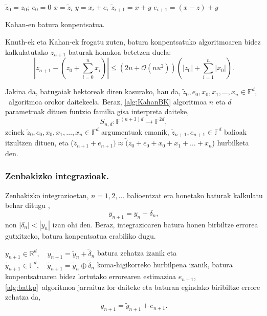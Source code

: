 \begin{algorithm}[H]
 \BlankLine
  $\tilde z_0= z_0; \ e_0=0$\;
  {
   \BlankLine
    $x=\tilde z_i$\;
    $y= x_i+e_i$\;
    $\tilde z_{i+1}=x+y$\;
    $e_{i+1}=(x-z)+y$\;
   \BlankLine
  }
 \caption{Kahan-en batura konpentsatua.}
   \label{alg:KahanBK}
\end{algorithm}

Knuth-ek eta Kahan-ek \cite{Muller2009} frogatu zuten,  batura konpentsatuko algoritmoaren bidez kalkulatutako $z_{n+1}$ baturak honakoa betetzen duela:
\begin{equation*}
\left | z_{n+1} - (z_0+\sum_{i=0}^{n} x_i) \right | \leq (2u+ \mathcal{O}(nu^2)) \left(|z_0|+\sum_{i=1}^{n} |x_0|\right).
\end{equation*}

Jakina da, batugaiak bektoreak diren kasurako, hau da, $\tilde z_0, e_0, x_0, x_1, \dots, x_n \in \mathbb{F}^d$, ~algoritmoa orokor daitekeela. Beraz, \ref{alg:KahanBK} algoritmoa $n$ eta $d$ parametroak dituen funtzio familia gisa interpreta daiteke,
\begin{equation}
\label{eq:batsd}
S_{n,d} : \mathbb{F}^{(n+3)d} \rightarrow \mathbb{F}^{2d},
\end{equation}
zeinek $\tilde z_0, e_0, x_0, x_1, \dots, x_n \in \mathbb{F}^d$ argumentuak emanik, $\tilde z_{n+1}, e_{n+1} \in \mathbb{F}^d$ balioak itzultzen dituen, eta ($\tilde z_{n+1}+e_{n+1}) \approx \tilde (z_0+e_0+x_0+x_1+ \dots+x_n$) hurbilketa den.

\subsubsection*{Zenbakizko integrazioak.}
 
Zenbakizko integrazioetan, $n=1,2,\dots$ balioentzat era honetako baturak kalkulatu behar ditugu \cite{Hairer2006},
\begin{equation*}
y_{n+1}=y_n+\delta_n,
\end{equation*}  
non $|\delta_n|<|y_n|$ izan ohi den. Beraz, integrazioaren batura honen birbiltze errorea gutxitzeko, batura konpentsatua erabiliko dugu.  

$y_{n+1} \in \mathbb{R}^{d},\quad y_{n+1}=\tilde y_{n}+\tilde \delta_n$ batura zehatza izanik eta $\tilde y_{n+1} \in \mathbb{F}^{d}, \quad \tilde y_{n+1}=\tilde y_{n} \oplus \tilde \delta_n$ koma-higikorreko hurbilpena izanik, batura konpentsatuaren bidez lortutako errorearen estimazioa $e_{n+1}$, \ref{alg:batkp}~algoritmoa jarraituz lor daiteke eta baturan egindako biribiltze errore zehatza da, 
\begin{equation}
y_{n+1}=\tilde {y}_{n+1}+e_{n+1}. 
\end{equation}

